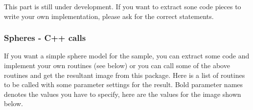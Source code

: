 \documentclass[11pt]{article} %
\begin{document}
This part is still under development. If you want to extract sone code pieces to write your own implementation, please ask for the correct statements.

\subsubsection{Spheres - C++ calls}

If you want a simple sphere model for the sample, you can extract some code and implement your own routines (see below) or you can call some of the above routines and get the resultant image from this package. Here is a list of routines to be called with some parameter settings for the result. Bold parameter names denotes the values you have to specify, here are the values for the image shown below.
\end{document}
